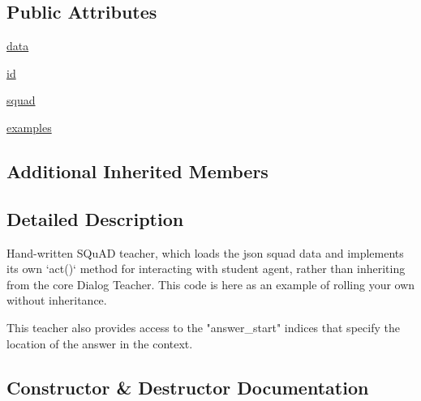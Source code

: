 \subsection*{Public Attributes}
\begin{DoxyCompactItemize}
\item 
\hyperlink{classparlai_1_1tasks_1_1squad_1_1agents_1_1IndexTeacher_a5642534b352e57c59dec249f9305d80d}{data}
\item 
\hyperlink{classparlai_1_1tasks_1_1squad_1_1agents_1_1IndexTeacher_a7c35d02788f1d513a7b815083cfecbf8}{id}
\item 
\hyperlink{classparlai_1_1tasks_1_1squad_1_1agents_1_1IndexTeacher_a419cb93430d8865d83f4968daf3b77d1}{squad}
\item 
\hyperlink{classparlai_1_1tasks_1_1squad_1_1agents_1_1IndexTeacher_a2ab5fd73dc8ce2b290aebd13f40540b5}{examples}
\end{DoxyCompactItemize}
\subsection*{Additional Inherited Members}


\subsection{Detailed Description}
\begin{DoxyVerb}Hand-written SQuAD teacher, which loads the json squad data and implements its own
`act()` method for interacting with student agent, rather than inheriting from the
core Dialog Teacher. This code is here as an example of rolling your own without
inheritance.

This teacher also provides access to the "answer_start" indices that specify the
location of the answer in the context.
\end{DoxyVerb}
 

\subsection{Constructor \& Destructor Documentation}
\mbox{\label{classparlai_1_1tasks_1_1squad_1_1agents_1_1IndexTeacher_ad198efa0868254d0ec2f45582e601849}} 
